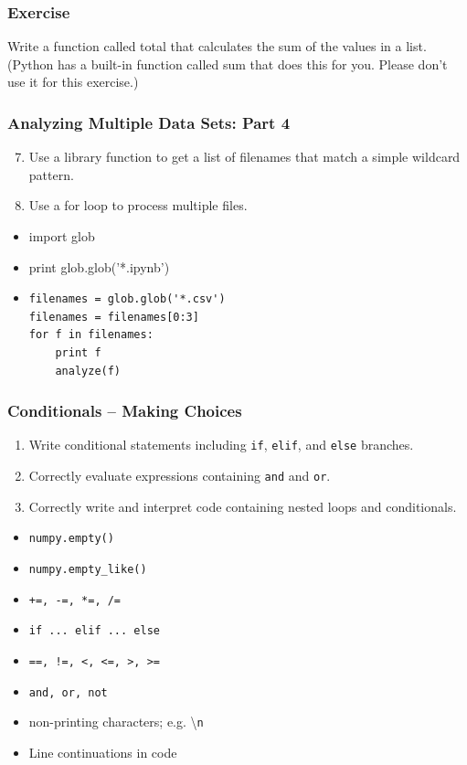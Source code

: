 \documentclass[xcolor=dvipsnames]{beamer}
\begin{document}
\begin{frame}
\frametitle{Exercise}
Write a function called total that calculates the sum of the values in a list. (Python has a built-in function called sum that does this for you. Please don't use it for this exercise.)
\end{frame}

\begin{frame}[fragile]
\frametitle{Analyzing Multiple Data Sets: Part 4}
\begin{enumerate}
\setcounter{enumi}{6}
\item     Use a library function to get a list of filenames that match a simple wildcard pattern.
\item    Use a for loop to process multiple files.
\end{enumerate}
\begin{itemize}
\item import glob
\item print glob.glob('*.ipynb')
\item
\begin{verbatim}
filenames = glob.glob('*.csv')
filenames = filenames[0:3]
for f in filenames:
    print f
    analyze(f)
\end{verbatim}
\end{itemize}
\end{frame}


\begin{frame}
\frametitle{Conditionals -- Making Choices}
\begin{enumerate}
  \item Write conditional statements including {\tt if}, {\tt elif}, and {\tt else} branches.
  \item Correctly evaluate expressions containing {\tt and} and {\tt or}.
  \item Correctly write and interpret code containing nested loops and conditionals.
\end{enumerate}
\begin{multicols}{2}
\begin{itemize}
  \item {\tt numpy.empty()}
  \item {\tt numpy.empty\_like()}
  \item {\tt +=, -=, *=, /=}
  \item {\tt if ... elif ... else}
  \item {\tt ==, !=, <, <=, >, >=}
  \item {\tt and, or, not}
  \item non-printing characters; e.g. \textbackslash{\tt n}
  \item Line continuations in code
\end{itemize}
\end{multicols}
\end{frame}
\end{document}
